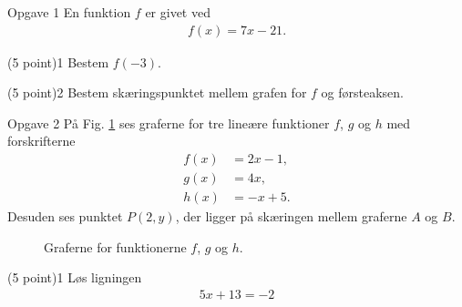 \documentclass[12pt,x11names,a4paper]{article}
\begin{document}
\begin{opgavetekst}{Opgave 1}
En funktion $f$ er givet ved 
\begin{align*}
f(x) = 7x - 21.
\end{align*}
\end{opgavetekst}
\begin{delopgave}{(5 point)}{1}
		Bestem $f(-3)$.
\end{delopgave}
\begin{delopgave}{(5 point)}{2}
	Bestem skæringspunktet mellem grafen for $f$ og førsteaksen.
\end{delopgave}
\begin{opgavetekst}{Opgave 2}
	På Fig. \ref{fig:lines} ses graferne for tre lineære funktioner $f$, $g$ og $h$ med forskrifterne 
	\begin{align*}
		f(x) &= 2x-1,\\
		g(x) &= 4x,\\
		h(x) &= -x+5.
	\end{align*}
	Desuden ses punktet $P(2,y)$, der ligger på skæringen mellem graferne $A$ og $B$.
	\begin{figure}[H]
		\centering
		\caption{Graferne for funktionerne $f$, $g$ og $h$.}
		\label{fig:lines}
	\end{figure}\phantom{h}
\end{opgavetekst}
\begin{delopgave}{\colorbox{NorregGroen!40}{(5 point)}}{1}
	Løs ligningen 
	\begin{align*}
	5x+13 =-2
	\end{align*}
\end{delopgave}
\end{document}
